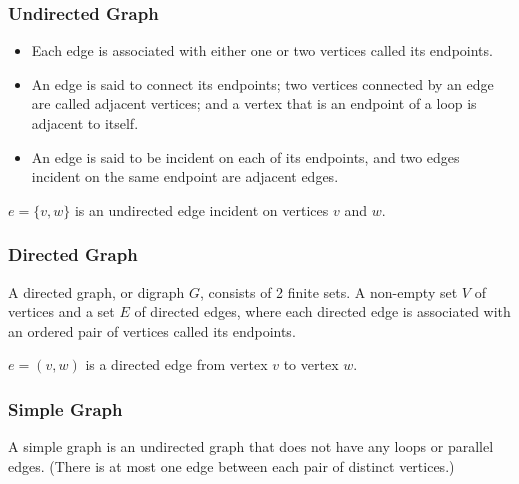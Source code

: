 \documentclass{article}
\theoremstyle{plain}
\theoremstyle{definition}
\theoremstyle{remark}
\begin{document}
\subsubsection*{Undirected Graph}
\begin{itemize}
    \item Each edge is associated with either one or two vertices called its endpoints.
    \item An edge is said to connect its endpoints; two vertices connected by an edge are called adjacent vertices; and a vertex that is an endpoint of a loop is adjacent to itself.
    \item An edge is said to be incident on each of its endpoints, and two edges incident on the same endpoint are adjacent edges.
\end{itemize}
$e = \{v, w\}$ is an undirected edge incident on vertices $v$ and $w$.
 
\subsubsection*{Directed Graph}
A directed graph, or digraph $G$, consists of 2 finite sets. A non-empty set $V$ of vertices and a set $E$ of directed edges, where each directed edge is associated with an ordered pair of vertices called its endpoints.
 
$e = (v, w)$ is a directed edge from vertex $v$ to vertex $w$.
 
\subsubsection*{Simple Graph}
A simple graph is an undirected graph that does not have any loops or parallel edges. (There is at most one edge between each pair of distinct vertices.)
 
\begin{center}
\end{center}
 
\end{document}
